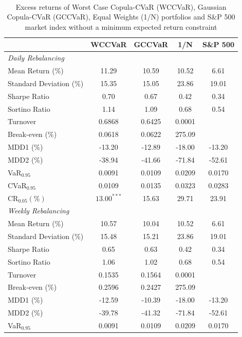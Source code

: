 \documentclass[a4paper,10pt]{article}
\begin{document}
\begin{table}[!ht]
	\caption{Excess returns of Worst Case Copula-CVaR (WCCVaR), Gaussian Copula-CVaR (GCCVaR), Equal Weights (1/N) portfolios and S\&P 500 market index without a minimum expected return constraint}
	\label{tab:tabletwo}\centering
	\scriptsize \
	\begin{tabularx}{\textwidth}{@{\extracolsep{\fill}}lcccc@{}}
		\toprule & \textbf{WCCVaR} & \textbf{GCCVaR} & \textbf{1/N} & \textbf{S\&P 500%
		} \\
		\midrule[\heavyrulewidth] \textit{Daily Rebalancing} &  &  &  &  \\
		\midrule[\heavyrulewidth] Mean Return (\%) &  11.29 & 10.59 & 10.52 & 6.61
		\\
		Standard Deviation (\%) & 15.35 &  15.05 & 23.86 & 19.01 \\
		Sharpe Ratio &  0.70 & 0.67 & 0.42 & 0.34 \\
		Sortino Ratio & 1.14 & 1.09 & 0.68 & 0.54 \\
		Turnover & 0.6868 & 0.6425 & 0.0001 &  \\
		Break-even (\%) & 0.0618 & 0.0622 & 275.09 &  \\
		MDD1 (\%) & -13.20 &  -12.89 & -18.00 & -13.20 \\
		MDD2 (\%) &  -38.94 & -41.66 & -71.84 & -52.61 \\
		VaR$_{0.95}$ &  0.0091 & 0.0109 & 0.0209  & 0.0170 \\
		CVaR$_{0.95}$ & 0.0109 & 0.0135 & 0.0323 & 0.0283 \\
		CR$_{0.05} (\%)$ &  $13.00^{***}$ & 15.63 & 29.71  & 23.91 \\
		\midrule[\heavyrulewidth] \textit{Weekly Rebalancing} &  &  &  &  \\
		\midrule[\heavyrulewidth] Mean Return (\%) & 10.57 & 10.04 & 10.52 & 6.61
		\\
		Standard Deviation (\%) & 15.48 & 15.21 & 23.86 & 19.01 \\
		Sharpe Ratio & 0.65 & 0.63 & 0.42 & 0.34 \\
		Sortino Ratio & 1.06 & 1.02 & 0.68 & 0.54 \\
		Turnover & 0.1535 & 0.1564 & 0.0001 &  \\
		Break-even (\%) &  0.2596 & 0.2427 & 275.09 &  \\
		MDD1 (\%) & -12.59 & -10.39 & -18.00 & -13.20 \\
		MDD2 (\%) & -39.78 & -41.32 & -71.84 & -52.61 \\
		VaR$_{0.95}$ &  0.0091 & 0.0109 & 0.0209  & 0.0170 \\

\end{tabularx}
\end{table}
\end{document}
